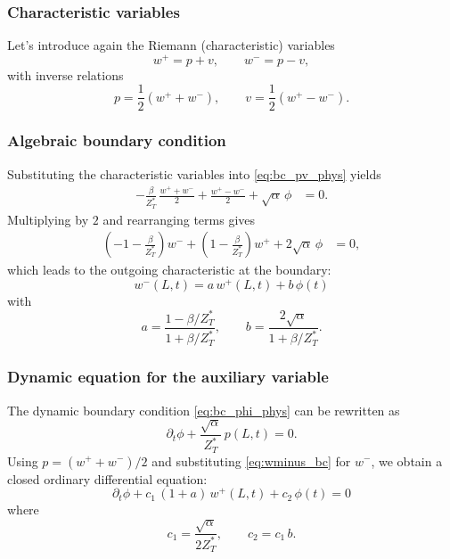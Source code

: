 \documentclass[11pt,a4paper]{report}
\theoremstyle{plain}
\theoremstyle{definition}
\begin{document}
\subsubsection{Characteristic variables}

Let's introduce again the Riemann (characteristic) variables
\begin{equation}
    w^+ = p + v, \qquad
    w^- = p - v,
\end{equation}
with inverse relations
\begin{equation}
    p = \frac12 (w^+ + w^-), \qquad
    v = \frac12 (w^+ - w^-).
\end{equation}

\subsubsection{Algebraic boundary condition}

Substituting the characteristic variables into \eqref{eq:bc_pv_phys} yields
\begin{align}
    -\frac{\beta}{Z_T^\ast}\,\frac{w^+ + w^-}{2}
    + \frac{w^+ - w^-}{2}
    + \sqrt{\alpha}\,\phi
    &= 0.
\end{align}
Multiplying by $2$ and rearranging terms gives
\begin{align}
    \left(-1 - \frac{\beta}{Z_T^\ast}\right) w^-
    + \left(1 - \frac{\beta}{Z_T^\ast}\right) w^+
    + 2\sqrt{\alpha}\,\phi
    &= 0,
\end{align}
which leads to the outgoing characteristic at the boundary:
\begin{equation}
    \boxed{
    w^-(L,t)
    =
    a\, w^+(L,t)
    + b\, \phi(t)
    }
    \label{eq:wminus_bc}
\end{equation}
with
\begin{equation}
    a = \frac{1-\beta/Z_T^\ast}{1+\beta/Z_T^\ast},
    \qquad
    b = \frac{2\sqrt{\alpha}}{1+\beta/Z_T^\ast}.
\end{equation}

\subsubsection{Dynamic equation for the auxiliary variable}

The dynamic boundary condition \eqref{eq:bc_phi_phys} can be rewritten as
\begin{equation}
    \partial_t \phi
    + \frac{\sqrt{\alpha}}{Z_T^\ast}\, p(L,t) = 0.
\end{equation}
Using $p = (w^+ + w^-)/2$ and substituting \eqref{eq:wminus_bc} for $w^-$, we obtain a closed
ordinary differential equation:
\begin{equation}
    \boxed{
    \partial_t \phi
    + c_1\, (1+a) \, w^+(L,t)
    + c_2\, \phi(t)
    = 0
    }
\end{equation}
where
\begin{equation}
    c_1 = \frac{\sqrt{\alpha}}{2 Z_T^\ast},
    \qquad
    c_2 = c_1\, b.
\end{equation}
\end{document}
